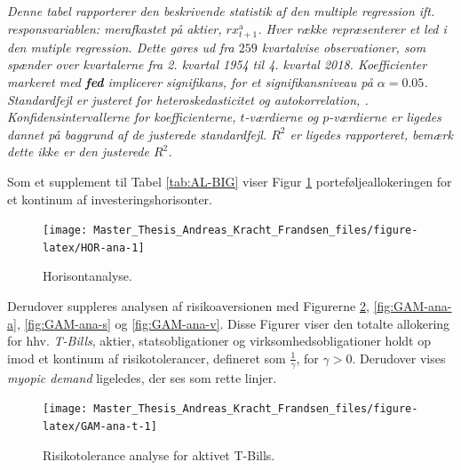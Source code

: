 \documentclass[
  a4paper,
  oneside]{memoir}
\begin{document}
\begin{table}[H]
{\begin{threeparttable}
\begin{tabular}[t]{llrrrrrrrr}
\bottomrule
\end{tabular}
\begin{tablenotes}
\item \textit{Denne tabel rapporterer den beskrivende statistik af den multiple regression ift. responsvariablen: merafkastet på aktier, $rx_{t+1}^{\text{a}}$. Hver række repræsenterer et led i den mutiple regression. Dette gøres ud fra $259$ kvartalvise observationer, som spænder over kvartalerne fra 2. kvartal 1954 til 4. kvartal 2018. Koefficienter markeret med \textbf{fed} implicerer signifikans, for et signifikansniveau på $\alpha=0.05$. Standardfejl er justeret for heteroskedasticitet og autokorrelation, \citep{Newey1987}. Konfidensintervallerne for koefficienterne, $t$-værdierne og $p$-værdierne er ligedes dannet på baggrund af de justerede standardfejl. $R^2$ er ligedes rapporteret, bemærk dette ikke er den justerede $R^2$.}
\end{tablenotes}
\end{threeparttable}}
\end{table}

Som et supplement til Tabel \ref{tab:AL-BIG} viser Figur \ref{fig:HOR-ana} porteføljeallokeringen for et kontinum af investeringshorisonter.

\begin{figure}[H]

{\centering \texttt{[image: Master\_Thesis\_Andreas\_Kracht\_Frandsen\_files/figure-latex/HOR-ana-1]} 

}

\caption{Horisontanalyse.}\label{fig:HOR-ana}
\end{figure}

Derudover suppleres analysen af risikoaversionen med Figurerne \ref{fig:GAM-ana-t}, \ref{fig:GAM-ana-a}, \ref{fig:GAM-ana-s} og \ref{fig:GAM-ana-v}. Disse Figurer viser den totalte allokering for hhv. \emph{T-Bills}, aktier, statsobligationer og virksomhedsobligationer holdt op imod et kontinum af risikotolerancer, defineret som \(\tfrac{1}{\gamma}\), for \(\gamma>0\). Derudover vises \emph{myopic demand} ligeledes, der ses som rette linjer.

\begin{figure}[H]

{\centering \texttt{[image: Master\_Thesis\_Andreas\_Kracht\_Frandsen\_files/figure-latex/GAM-ana-t-1]} 

}

\caption{Risikotolerance analyse for aktivet T-Bills.}\label{fig:GAM-ana-t}
\end{figure}
\end{document}
